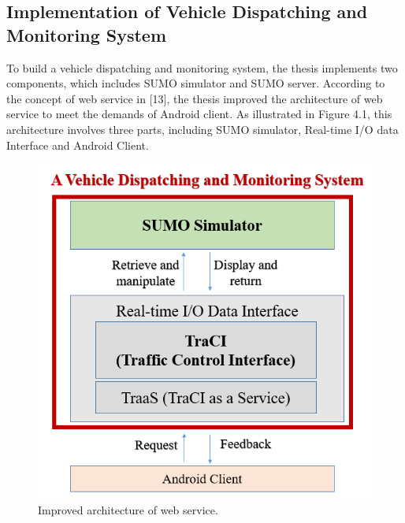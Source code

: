 \documentclass[12pt]{ksthesis}
\begin{document}
\begin{thesis}
{\chapter{Implementation of Vehicle Dispatching and Monitoring System }\label{Chap:Architecture}

To build a vehicle dispatching and monitoring system, the thesis implements two components, which includes SUMO simulator and SUMO server. According to the concept of web service in [13], the thesis improved the architecture of web service to meet the demands of Android client.
As illustrated in Figure 4.1, this architecture involves three parts, including SUMO simulator, Real-time I/O data Interface and Android Client.



\begin{figure}[t!]
\centering
\includegraphics[scale=0.55]{./Thesis_figures/F4-1_webService_arcitecture.PNG}
\caption{\large Improved architecture of web service.}
\vspace{0.5cm}
\label{Fig:Improved_architecture_of_web_service}
\end{figure}



}
\end{thesis}
\end{document}
